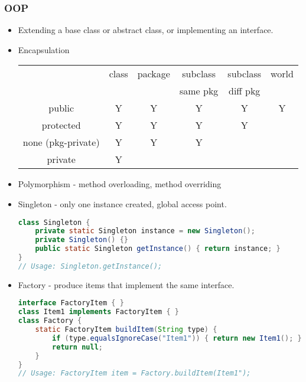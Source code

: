\documentclass[10pt]{article}
\begin{document}
\subsubsection{OOP}
\begin{itemize}
    \itemsep0em
    \item Extending a base class or abstract class, or implementing an interface.
    \item Encapsulation\\
    \begin{tabular}{|c|c|c|c|c|c|}
    \hline
         & class & package & subclass & subclass & world \\
         & & & same pkg & diff pkg &\\
         \hline
        public & Y & Y & Y & Y & Y\\
        protected & Y & Y & Y & Y & \\
        none (pkg-private) & Y & Y & Y & & \\
        private & Y & & & &\\
        \hline
    \end{tabular}
    \item Polymorphism - method overloading, method overriding
    \item Singleton - only one instance created, global access point.
\begin{lstlisting}[language=java]
class Singleton {
    private static Singleton instance = new Singleton();
    private Singleton() {}
    public static Singleton getInstance() { return instance; }
}
// Usage: Singleton.getInstance();
\end{lstlisting}
    \item Factory - produce items that implement the same interface.
\begin{lstlisting}[language=java]
interface FactoryItem { }
class Item1 implements FactoryItem { }
class Factory {
    static FactoryItem buildItem(String type) {
        if (type.equalsIgnoreCase("Item1")) { return new Item1(); }
        return null;
    }
}
// Usage: FactoryItem item = Factory.buildItem(Item1");
\end{lstlisting}

\begin{comment}
    \item Builder - method chaining makes it easier to set multiple fields.
\begin{lstlisting}[language=java]
public class Item {
    private final int field1;
    private Item() {}
    Item(Builder builder) { field1 = builder.field1; }
    static class Builder {
        private int field1;
        private Builder();
        static Builder newInstance() { return new Builder(); }
        Builder setField1(int field1) {
            this.field1 = field1;
            return this;
        }
        Item build() { return new Item(this); }
    }
}
// Usage: Item.Builder.newInstance().setField1(1)./*...*/.build();
\end{lstlisting}


\end{comment}
\end{itemize}
\end{document}
